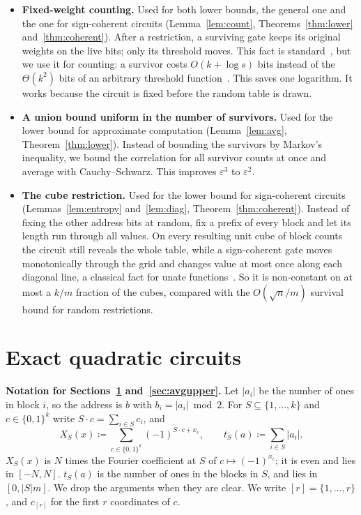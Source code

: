 \documentclass[11pt,letterpaper]{article}
\theoremstyle{remark}
\newcommand{\bits}{\{0,1\}}
\newcommand{\sect}[1]{\section{\texorpdfstring{\color{ink}#1}{#1}}}
\begin{document}
\begin{itemize}
\item \textbf{Fixed-weight counting.} Used for both lower bounds, the
      general one and the one for sign-coherent circuits
      (Lemma~\ref{lem:count}, Theorems~\ref{thm:lower} and~\ref{thm:coherent}). After a restriction, a
      surviving gate keeps its original weights on the live bits; only its
      threshold moves. This fact is standard~\cite{KW,CSS,CTW}, but we use it
      for counting: a survivor costs $O(k+\log s)$ bits instead of the
      $\Theta(k^2)$ bits of an arbitrary threshold function~\cite{KW,KKL,CSS}.
      This saves one logarithm. It works because the circuit is fixed before
      the random table is drawn.
\item \textbf{A union bound uniform in the number of survivors.} Used
      for the lower bound for approximate computation (Lemma~\ref{lem:avg},
      Theorem~\ref{thm:lower}). Instead of bounding the
      survivors by Markov's inequality, we bound the correlation for all
      survivor counts at once and average with Cauchy--Schwarz. This improves
      $\varepsilon^3$ to $\varepsilon^2$.
\item \textbf{The cube restriction.} Used for the lower bound for
      sign-coherent circuits (Lemmas~\ref{lem:entropy} and~\ref{lem:diag},
      Theorem~\ref{thm:coherent}). Instead of fixing the other address bits at
      random, fix a prefix of every block and let its length run through all
      values. On every resulting unit cube of block counts the circuit still
      reveals the whole table, while a sign-coherent gate moves monotonically
      through the grid and changes value at most once along each diagonal
      line, a classical fact for unate functions~\cite[Lemma~2.1]{IPS}. So it
      is non-constant on at most a $k/m$ fraction of the cubes, compared
      with the $O(\sqrt n/m)$ survival bound for random restrictions.
\end{itemize}

\sect{Exact quadratic circuits}\label{sec:upper}

\begin{keybox}
\textbf{Notation for Sections~\ref{sec:upper} and~\ref{sec:avgupper}.}
Let $|a_i|$ be the number of ones in block $i$, so the address is $b$
with $b_i=|a_i|\bmod2$.
For $S\subseteq\{1,\dots,k\}$ and $c\in\bits^k$ write $S\cdot c=\sum_{i\in S}c_i$, and
\[
X_S(x)\coloneqq\sum_{c\in\bits^k}(-1)^{S\cdot c+x_c},\qquad
t_S(a)\coloneqq\sum_{i\in S}|a_i| .
\]
$X_S(x)$ is $N$ times the Fourier coefficient at $S$ of $c\mapsto(-1)^{x_c}$;
it is even and lies in $[-N,N]$. $t_S(a)$ is the number of ones in the blocks in
$S$, and lies in $[0,|S|m]$. We drop the arguments when they are clear.
We write $[r]=\{1,\dots,r\}$, and $c_{[r]}$ for the first $r$ coordinates of $c$.
\end{keybox}
\end{document}
